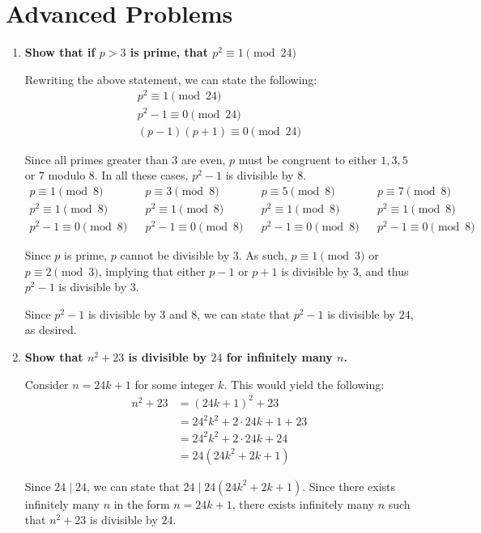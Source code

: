 \documentclass[12pt]{article}
\newcommand{\tdiv}{\; | \;}
\begin{document}
\section*{Advanced Problems}
\begin{enumerate}
    \item \textbf{Show that if $p > 3$ is prime, that $p^2 \equiv 1 \pmod{24}$}
    
    Rewriting the above statement, we can state the following:
    \begin{align*}
        p^2 \equiv 1 \pmod{24} \\
        p^2 - 1 \equiv 0 \pmod{24} \\
        (p - 1)(p + 1) \equiv 0 \pmod{24}
    \end{align*}
    
    Since all primes greater than $3$ are even, $p$ must be congruent to either $1, 3, 5$ or $7$ modulo $8$. In all these cases, $p^2 - 1$ is divisible by $8$.
    \begin{align*}
        p \equiv 1 \pmod{8} && p \equiv 3 \pmod{8} && p \equiv 5 \pmod{8} && p \equiv 7 \pmod{8} \\
        p^2 \equiv 1 \pmod{8} && p^2 \equiv 1 \pmod{8} && p^2 \equiv 1 \pmod{8} && p^2 \equiv 1 \pmod{8} \\
        p^2 - 1 \equiv 0 \pmod{8} && p^2 - 1 \equiv 0 \pmod{8} && p^2 - 1 \equiv 0 \pmod{8} && p^2 - 1 \equiv 0 \pmod{8} 
    \end{align*}
    
    Since $p$ is prime, $p$ cannot be divisible by $3$. As such, $p \equiv 1 \pmod{3}$ or $p \equiv 2 \pmod{3}$, implying that either $p - 1$ or $p + 1$ is divisible by $3$, and thus $p^2 - 1$ is divisible by $3$.
    
    Since $p^2 - 1$ is divisible by $3$ and $8$, we can state that $p^2 - 1$ is divisible by $24$, as desired.
    
    \item \textbf{Show that $n^2 + 23$ is divisible by $24$ for infinitely many $n$.}
    
    Consider $n = 24k + 1$ for some integer $k$. This would yield the following:
    \begin{align*}
        n^2 + 23 &= (24k + 1)^2 + 23 \\
                &= 24^2k^2 + 2\cdot 24k + 1 + 23 \\
                &= 24^2k^2 + 2\cdot 24k + 24 \\
                &= 24(24k^2 + 2k + 1)
    \end{align*}
    
    Since $24 \tdiv 24$, we can state that $24 \tdiv 24(24k^2 + 2k + 1)$. Since there exists infinitely many $n$ in the form $n = 24k + 1$, there exists infinitely many $n$ such that $n^2 + 23$ is divisible by $24$.
    
\end{enumerate}
\end{document}
